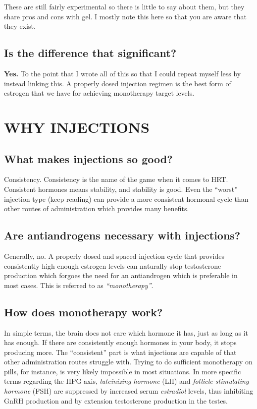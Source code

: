 \documentclass{article}
\begin{document}
These are still fairly experimental so there is little to say about them, but they share pros and cons with gel. I mostly note this here so that you are aware that they exist.

\subsection{Is the difference that significant?}

\textbf{Yes.} To the point that I wrote all of this so that I could repeat myself less by instead linking this. A properly dosed injection regimen is the best form of estrogen that we have for achieving monotherapy target levels.

 

\section{WHY INJECTIONS}

\subsection{What makes injections so good?}

Consistency. Consistency is the name of the game when it comes to HRT. Consistent hormones means stability, and stability is good. Even the “worst” injection type (keep reading) can provide a more consistent hormonal cycle than other routes of administration which provides many benefits.

\subsection{Are antiandrogens necessary with injections?}

Generally, no. A properly dosed and spaced injection cycle that provides consistently high enough estrogen levels can naturally stop testosterone production which forgoes the need for an antiandrogen which is preferable in most cases. This is referred to as \textit{“monotherapy”}.

\subsection{How does monotherapy work?}\label{2-3}

In simple terms, the brain does not care which hormone it has, just as long as it has enough. If there are consistently enough hormones in your body, it stops producing more. The “consistent” part is what injections are capable of that other administration routes struggle with. Trying to do sufficient monotherapy on pills, for instance, is very likely impossible in most situations. In more specific terms regarding the HPG axis, \textit{luteinizing hormone} (LH) and \textit{follicle-stimulating hormone} (FSH) are suppressed by increased serum \textit{estradiol} levels, thus inhibiting GnRH production and by extension testosterone production in the testes.
\end{document}
